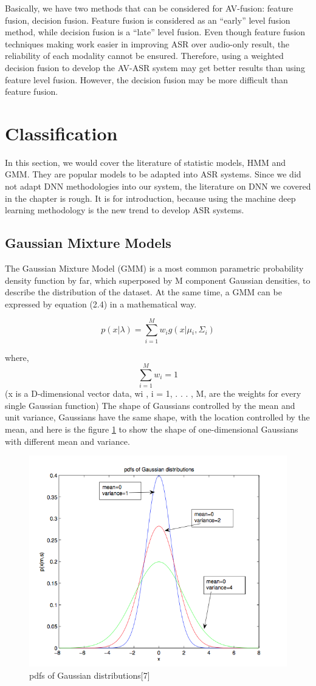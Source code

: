 Basically, we have two methods that can be considered for AV-fusion: feature fusion, decision fusion. Feature fusion is considered as an “early” level fusion method, while decision fusion is a “late” level fusion\cite{Reference13}. Even though feature fusion techniques making work easier in improving ASR over audio-only result, the reliability of each modality cannot be ensured. Therefore, using a weighted decision fusion to develop the AV-ASR system may get better results than using feature level fusion. However, the decision fusion may be more difficult than feature fusion.

\section{Classification}
In this section, we would cover the literature of statistic models, HMM and GMM. They are popular models to be adapted into ASR systems. Since we did not adapt DNN methodologies into our system, the literature on DNN we covered in the chapter is rough. It is for introduction, because using the machine deep learning methodology is the new trend to develop ASR systems.

\subsection{Gaussian Mixture Models}
The Gaussian Mixture Model \cite{Reference14}(GMM) is a most common parametric probability density function by far, which superposed by M component Gaussian densities, to describe the distribution of the dataset.
At the same time, a GMM can be expressed by equation (2.4) in a mathematical way. 

\begin{equation}
p(x|\lambda )=\sum_{i=1}^{M}w{_{i}}g(x|\mu{_{i}},\Sigma _{i} )
\end{equation}

where, \begin{equation}
\sum_{i=1}^{M}w{_{i}}=1
\end{equation}
  (x is a D-dimensional vector data, wi , i = 1, . . . , M, are the weights for every single Gaussian function)
The shape of Gaussians controlled by the mean and unit variance,  
Gaussians have the same shape, with the location controlled by the mean, and here is the figure \ref{fig:gmm} to show the shape of one-dimensional Gaussians with different mean and variance.

\begin{figure}[ht]
\centering
\includegraphics[width=0.5\linewidth]{figures/gmm.png}
\caption{pdfs of Gaussian distributions[7]}
\label{fig:gmm}
\end{figure}

